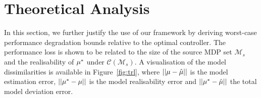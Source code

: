 \section{Theoretical Analysis}\label{sec:bounds}

In this section, we further justify the use of our framework by deriving worst-case performance degradation bounds relative to the optimal controller. The performance loss is shown to be related to the size of the source MDP set $\mathcal{M}_s$ and the realisability of $\mu^{*}$ under $\mathcal{C}(\mathcal{M}_s)$. A visualisation of the model dissimilarities is available in Figure~\ref{fig:trl}, where $||\mu-\hat{\mu}||$ is the model estimation error, $||\mu^{*}-\mu||$ is the model realisability error and $||\mu^{*}-\hat{\mu}||$ the total model deviation error.


\iffalse
\subsection{Performance Gap in the Realisable Setting}

\begin{theorem}{Performance Gap of Realisable Models}
    \begin{equation}
        ||V_{{\mdp}_t}^{*}-\hat{V}_{{\mdp}_t, n}^{\pol^{*}(\hat{\Delta_{\mathrm{Realise}}})}|| \leq \, ???.
    \end{equation}
\end{theorem}
\fi


